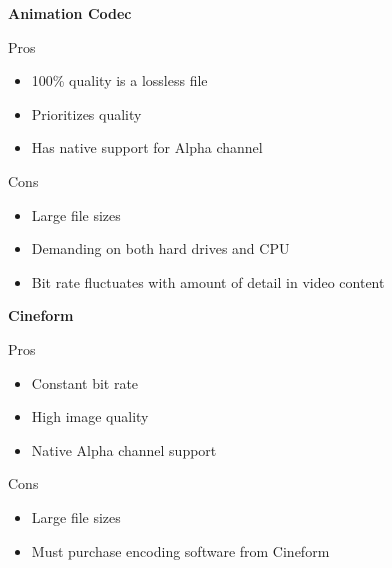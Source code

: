\begin{fullwidth}
\vspace{6mm}

\noindent \textbf{Animation Codec}

\vspace{3mm}

Pros
\begin{itemize}
\item 100\% quality is a lossless file
\item Prioritizes quality 
\item Has native support for Alpha channel 
\end{itemize}

\vspace{3mm}

Cons
\begin{itemize}
\item Large file sizes
\item Demanding on both hard drives and CPU
\item Bit rate fluctuates with amount of detail in video content
\end{itemize}

\vspace{6mm}

\noindent \textbf{Cineform} 

\vspace{3mm}

Pros
\begin{itemize}
\item Constant bit rate
\item High image quality
\item Native Alpha channel support
\end{itemize}

\vspace{3mm}

Cons
\begin{itemize}
\item Large file sizes
\item Must purchase encoding software from Cineform
\end{itemize}


\end{fullwidth}
